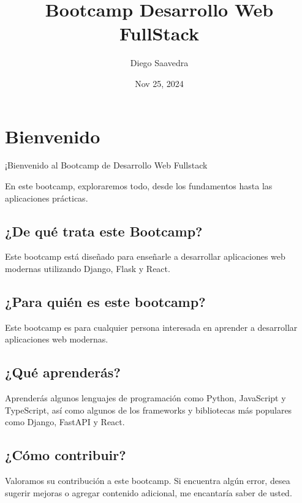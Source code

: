 \documentclass[
  a4paper,
  DIV=11,
  numbers=noendperiod,
  onepage,
  openany]{scrreprt}
\title{Bootcamp Desarrollo Web FullStack}
\author{Diego Saavedra}
\date{Nov 25, 2024}
\renewcommand*\contentsname{Table of contents}
\newcommand\contentsname{Table of contents}
\begin{document}
\maketitle

\renewcommand*\contentsname{Table of contents}
{
\hypersetup{linkcolor=}
\setcounter{tocdepth}{2}
\tableofcontents
}

\chapter{Bienvenido}\label{bienvenido}

¡Bienvenido al Bootcamp de Desarrollo Web Fullstack

En este bootcamp, exploraremos todo, desde los fundamentos hasta las
aplicaciones prácticas.

\section{¿De qué trata este
Bootcamp?}\label{de-quuxe9-trata-este-bootcamp}

Este bootcamp está diseñado para enseñarle a desarrollar aplicaciones
web modernas utilizando Django, Flask y React.

\section{¿Para quién es este
bootcamp?}\label{para-quiuxe9n-es-este-bootcamp}

Este bootcamp es para cualquier persona interesada en aprender a
desarrollar aplicaciones web modernas.

\section{¿Qué aprenderás?}\label{quuxe9-aprenderuxe1s}

Aprenderás algunos lenguajes de programación como Python, JavaScript y
TypeScript, así como algunos de los frameworks y bibliotecas más
populares como Django, FastAPI y React.

\section{¿Cómo contribuir?}\label{cuxf3mo-contribuir}

Valoramos su contribución a este bootcamp. Si encuentra algún error,
desea sugerir mejoras o agregar contenido adicional, me encantaría saber
de usted.
\end{document}
